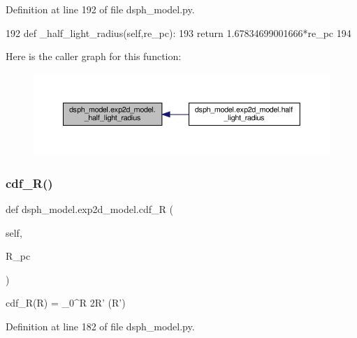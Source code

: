 Definition at line 192 of file dsph\+\_\+model.\+py.


\begin{DoxyCode}
192     \textcolor{keyword}{def }\_half\_light\_radius(self,re\_pc):
193         \textcolor{keywordflow}{return} 1.67834699001666*re\_pc
194     
\end{DoxyCode}
Here is the caller graph for this function\+:\nopagebreak
\begin{figure}[H]
\begin{center}
\leavevmode
\includegraphics[width=350pt]{df/d3d/classdsph__model_1_1exp2d__model_a8dc3dcfaa3f876ecf299acece3f6d518_icgraph}
\end{center}
\end{figure}
\mbox{\label{classdsph__model_1_1exp2d__model_a3a8c90e796e589216687bbe3cf4e42c5}} 
\subsubsection{\texorpdfstring{cdf\+\_\+\+R()}{cdf\_R()}}
{\footnotesize\ttfamily def dsph\+\_\+model.\+exp2d\+\_\+model.\+cdf\+\_\+R (\begin{DoxyParamCaption}\item[{}]{self,  }\item[{}]{R\+\_\+pc }\end{DoxyParamCaption})}

\begin{DoxyVerb}cdf_R(R) = \int_0^R  2\pi R' \Sigma(R')
\end{DoxyVerb}
 

Definition at line 182 of file dsph\+\_\+model.\+py.


